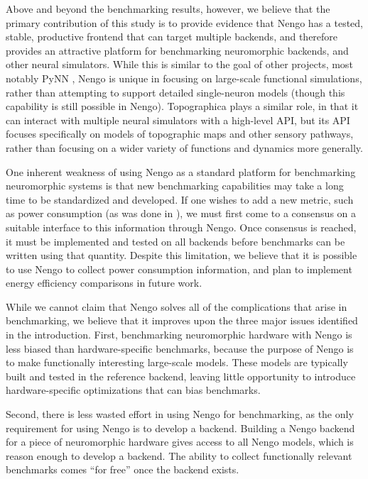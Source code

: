 \documentclass{frontiersSCNS}
\begin{document}
Above and beyond the benchmarking results,
however, we believe that the primary contribution
of this study is to provide evidence that Nengo
has a tested, stable, productive frontend
that can target multiple backends,
and therefore provides an attractive platform
for benchmarking neuromorphic backends,
and other neural simulators.
While this is similar to the goal
of other projects, most notably PyNN \citep{davison2008},
Nengo is unique in focusing on
large-scale functional simulations,
rather than attempting to support
detailed single-neuron models
(though this capability is still possible in Nengo).
Topographica \citep{bednar2009} plays a similar role,
in that it can interact with multiple neural simulators
with a high-level API, but its API focuses specifically
on models of topographic maps
and other sensory pathways,
rather than focusing on
a wider variety of functions
and dynamics more generally.

One inherent weakness of using Nengo
as a standard platform for benchmarking
neuromorphic systems is that new benchmarking
capabilities may take a long time to
be standardized and developed.
If one wishes to add a new metric,
such as power consumption
(as was done in \citealp{stromatias2013}),
we must first come to a consensus
on a suitable interface to this information
through Nengo.
Once consensus is reached,
it must be implemented and tested
on all backends before
benchmarks can be written using
that quantity.
Despite this limitation,
we believe that it is possible to use
Nengo to collect power consumption information,
and plan to implement energy efficiency comparisons
in future work.

While we cannot claim that Nengo
solves all of the complications that arise
in benchmarking,
we believe that it improves upon
the three major issues identified in the introduction.
First, benchmarking neuromorphic hardware
with Nengo is less biased than
hardware-specific benchmarks,
because the purpose of Nengo is
to make functionally interesting large-scale models.
These models are typically built and tested
in the reference backend,
leaving little opportunity to introduce
hardware-specific optimizations
that can bias benchmarks.

Second, there is less wasted effort
in using Nengo for benchmarking,
as the only requirement for using
Nengo is to develop a backend.
Building a Nengo backend for
a piece of neuromorphic hardware
gives access to all Nengo models,
which is reason enough to develop a backend.
The ability to collect functionally relevant benchmarks
comes ``for free'' once the backend exists.
\end{document}
